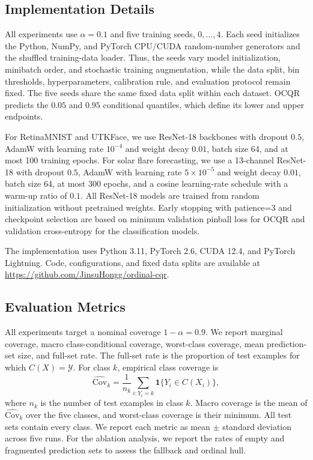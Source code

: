 \documentclass[conference]{IEEEtran}
\begin{document}
\subsection{Implementation Details}
\label{subsec:implementation_details}
All experiments use \(\alpha=0.1\) and five training seeds, \(0,\ldots,4\). Each seed initializes the Python, NumPy, and PyTorch CPU/CUDA random-number generators and the shuffled training-data loader. Thus, the seeds vary model initialization, minibatch order, and stochastic training augmentation, while the data split, bin thresholds, hyperparameters, calibration rule, and evaluation protocol remain fixed. The five seeds share the same fixed data split within each dataset. OCQR predicts the \(0.05\) and \(0.95\) conditional quantiles, which define its lower and upper endpoints.

For RetinaMNIST and UTKFace, we use ResNet-18 backbones with dropout \(0.5\), AdamW with learning rate \(10^{-4}\) and weight decay \(0.01\), batch size 64, and at most 100 training epochs. For solar flare forecasting, we use a 13-channel ResNet-18 with dropout \(0.5\), AdamW with learning rate \(5\times10^{-5}\) and weight decay \(0.01\), batch size 64, at most 300 epochs, and a cosine learning-rate schedule with a warm-up ratio of \(0.1\). All ResNet-18 models are trained from random initialization without pretrained weights. Early stopping with patience=\(3\) and checkpoint selection are based on minimum validation pinball loss for OCQR and validation cross-entropy for the classification models.

The implementation uses Python 3.11, PyTorch 2.6, CUDA 12.4, and PyTorch Lightning. Code, configurations, and fixed data splits are available at \url{https://github.com/JinsuHongg/ordinal-cqr}.

\subsection{Evaluation Metrics}
\label{subsec:evaluation_metrics}

All experiments target a nominal coverage \(1-\alpha=0.9\). We report marginal coverage, macro class-conditional coverage, worst-class coverage, mean prediction-set size, and full-set rate. The full-set rate is the proportion of test examples for which \(C(X)=\mathcal{Y}\). For class $k$, empirical class coverage is
\begin{equation}
\widehat{\mathrm{Cov}}_k
=
\frac{1}{n_k}
\sum_{i:Y_i=k}
\mathbf{1}\{Y_i\in C(X_i)\},
\label{eq:empirical_class_coverage}
\end{equation}
where \(n_k\) is the number of test examples in class \(k\). Macro coverage is the mean of \(\widehat{\mathrm{Cov}}_k\) over the five classes, and worst-class coverage is their minimum. All test sets contain every class. We report each metric as mean \(\pm\) standard deviation across five runs. For the ablation analysis, we report the rates of empty and fragmented prediction sets to assess the fallback and ordinal hull.
\end{document}
